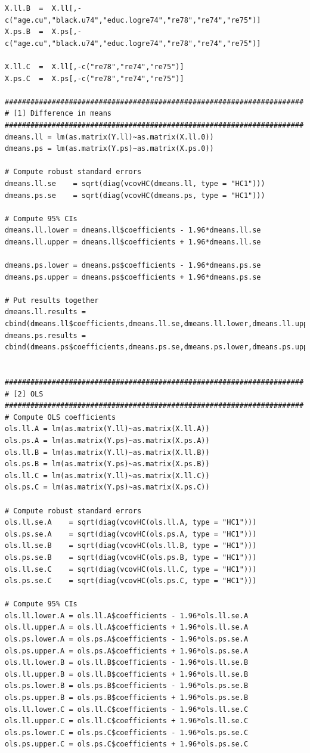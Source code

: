 \documentclass[12pt]{article}
\begin{document}
\begin{verbatim}
X.ll.B  =  X.ll[,-c("age.cu","black.u74","educ.logre74","re78","re74","re75")]
X.ps.B  =  X.ps[,-c("age.cu","black.u74","educ.logre74","re78","re74","re75")]

X.ll.C  =  X.ll[,-c("re78","re74","re75")]
X.ps.C  =  X.ps[,-c("re78","re74","re75")]

######################################################################
# [1] Difference in means
######################################################################
dmeans.ll = lm(as.matrix(Y.ll)~as.matrix(X.ll.0))
dmeans.ps = lm(as.matrix(Y.ps)~as.matrix(X.ps.0))

# Compute robust standard errors
dmeans.ll.se    = sqrt(diag(vcovHC(dmeans.ll, type = "HC1")))
dmeans.ps.se    = sqrt(diag(vcovHC(dmeans.ps, type = "HC1")))

# Compute 95% CIs
dmeans.ll.lower = dmeans.ll$coefficients - 1.96*dmeans.ll.se
dmeans.ll.upper = dmeans.ll$coefficients + 1.96*dmeans.ll.se

dmeans.ps.lower = dmeans.ps$coefficients - 1.96*dmeans.ps.se
dmeans.ps.upper = dmeans.ps$coefficients + 1.96*dmeans.ps.se

# Put results together
dmeans.ll.results = cbind(dmeans.ll$coefficients,dmeans.ll.se,dmeans.ll.lower,dmeans.ll.upper)
dmeans.ps.results = cbind(dmeans.ps$coefficients,dmeans.ps.se,dmeans.ps.lower,dmeans.ps.upper)


######################################################################
# [2] OLS
######################################################################
# Compute OLS coefficients
ols.ll.A = lm(as.matrix(Y.ll)~as.matrix(X.ll.A))
ols.ps.A = lm(as.matrix(Y.ps)~as.matrix(X.ps.A))
ols.ll.B = lm(as.matrix(Y.ll)~as.matrix(X.ll.B))
ols.ps.B = lm(as.matrix(Y.ps)~as.matrix(X.ps.B))
ols.ll.C = lm(as.matrix(Y.ll)~as.matrix(X.ll.C))
ols.ps.C = lm(as.matrix(Y.ps)~as.matrix(X.ps.C))

# Compute robust standard errors
ols.ll.se.A    = sqrt(diag(vcovHC(ols.ll.A, type = "HC1")))
ols.ps.se.A    = sqrt(diag(vcovHC(ols.ps.A, type = "HC1")))
ols.ll.se.B    = sqrt(diag(vcovHC(ols.ll.B, type = "HC1")))
ols.ps.se.B    = sqrt(diag(vcovHC(ols.ps.B, type = "HC1")))
ols.ll.se.C    = sqrt(diag(vcovHC(ols.ll.C, type = "HC1")))
ols.ps.se.C    = sqrt(diag(vcovHC(ols.ps.C, type = "HC1")))

# Compute 95% CIs
ols.ll.lower.A = ols.ll.A$coefficients - 1.96*ols.ll.se.A
ols.ll.upper.A = ols.ll.A$coefficients + 1.96*ols.ll.se.A
ols.ps.lower.A = ols.ps.A$coefficients - 1.96*ols.ps.se.A
ols.ps.upper.A = ols.ps.A$coefficients + 1.96*ols.ps.se.A
ols.ll.lower.B = ols.ll.B$coefficients - 1.96*ols.ll.se.B
ols.ll.upper.B = ols.ll.B$coefficients + 1.96*ols.ll.se.B
ols.ps.lower.B = ols.ps.B$coefficients - 1.96*ols.ps.se.B
ols.ps.upper.B = ols.ps.B$coefficients + 1.96*ols.ps.se.B
ols.ll.lower.C = ols.ll.C$coefficients - 1.96*ols.ll.se.C
ols.ll.upper.C = ols.ll.C$coefficients + 1.96*ols.ll.se.C
ols.ps.lower.C = ols.ps.C$coefficients - 1.96*ols.ps.se.C
ols.ps.upper.C = ols.ps.C$coefficients + 1.96*ols.ps.se.C


\end{verbatim}
\end{document}
